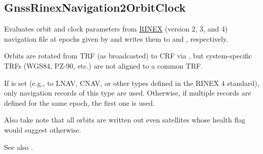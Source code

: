 \clearpage
\subsection{GnssRinexNavigation2OrbitClock}\label{GnssRinexNavigation2OrbitClock}
Evaluates orbit and clock parameters from \href{https://files.igs.org/pub/data/format/rinex_4.00.pdf}{RINEX} (version 2, 3, and 4)
navigation file  at epochs given by  and writes them to
 and , respectively.

Orbits are rotated from TRF (as broadcasted) to CRF via ,
but system-specific TRFs (WGS84, PZ-90, etc.) are not aligned to a common TRF.

If  is set (e.g., to LNAV, CNAV, or other types defined in the RINEX 4 standard), only navigation records of this type are used.
Otherwise, if multiple records are defined for the same epoch, the first one is used.

Also take note that all orbits are written out even satellites whose health flag would suggest otherwise.

See also .


